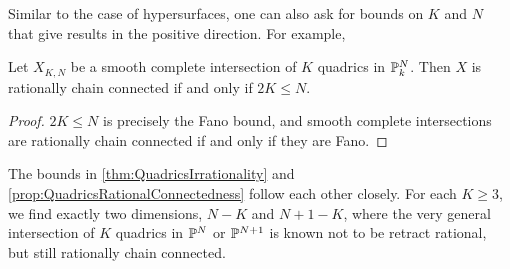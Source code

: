Similar to the case of hypersurfaces, one can also ask for bounds on $K$ and $N$ that give results in the positive direction. For example,
\begin{proposition}
	\label{prop:QuadricsRationalConnectedness}
  Let $X_{K,N}$ be a smooth complete intersection of $K$ quadrics in $\P_k^N$. Then $X$ is rationally chain connected if and only if $2K \leq N$.
\end{proposition}
\begin{proof}
  $2K \leq N$ is precisely the Fano bound, and smooth complete intersections are rationally chain connected if and only if they are Fano.
\end{proof}
\begin{remark}
	The bounds in \cref{thm:QuadricsIrrationality} and \cref{prop:QuadricsRationalConnectedness} follow each other closely. For each $K \geq 3$, we find exactly two dimensions, $N-K$ and $N+1-K$, where the very general intersection of $K$ quadrics in $\P^{N}$ or $\P^{N+1}$ is known not to be retract rational, but still rationally chain connected.
\end{remark}

